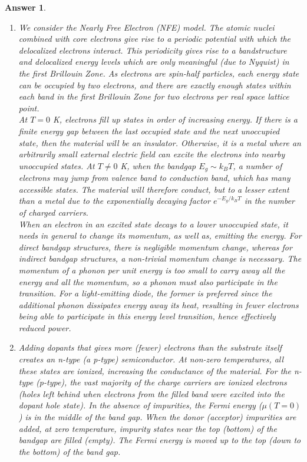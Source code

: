 \documentclass[a4paper]{article}
\newtheorem{ans}{Answer}[subsection]
\theoremstyle{new}
\begin{document}
\begin{ans}\leavevmode
\begin{enumerate}[label=(\roman*)]
\item We consider the Nearly Free Electron (NFE) model. The atomic nuclei combined with core electrons give rise to a periodic potential with which the delocalized electrons interact. This periodicity gives rise to a bandstructure and delocalized energy levels which are only meaningful (due to Nyquist) in the first Brillouin Zone. As electrons are spin-half particles, each energy state can be occupied by two electrons, and there are exactly enough states within each band in the first Brillouin Zone for two electrons per real space lattice point.\\[5pt]
At $T=0$ K, electrons fill up states in order of increasing energy. If there is a finite energy gap between the last occupied state and the next unoccupied state, then the material will be an insulator. Otherwise, it is a metal where an arbitrarily small external electric field can excite the electrons into nearby unoccupied states. At $T\neq 0$ K, when the bandgap $E_g\sim k_BT$, a number of electrons may jump from valence band to conduction band, which has many accessible states. The material will therefore conduct, but to a lesser extent than a metal due to the exponentially decaying factor $e^{-E_g/k_BT}$ in the number of charged carriers.\\[5pt]
When an electron in an excited state decays to a lower unoccupied state, it needs in general to change its momentum, as well as, emitting the energy. For direct bandgap structures, there is negligible momentum change, whereas for indirect bandgap structures, a non-trivial momentum change is necessary. The momentum of a phonon per unit energy is too small to carry away all the energy and all the momentum, so a phonon must also participate in the transition. For a light-emitting diode, the former is preferred since the additional phonon dissipates energy away its heat, resulting in fewer electrons being able to participate in this energy level transition, hence effectively reduced power.
\item Adding dopants that gives more (fewer) electrons than the substrate itself creates an n-type (a p-type) semiconductor. At non-zero temperatures, all these states are ionized, increasing the conductance of the material. For the n-type (p-type), the vast majority of the charge carriers are ionized electrons (holes left behind when electrons from the filled band were excited into the dopant hole state). In the absence of impurities, the Fermi energy ($\mu(T=0)$) is in the middle of the band gap. When the donor (acceptor) impurities are added, at zero temperature, impurity states near the top (bottom) of the bandgap are filled (empty). The Fermi energy is moved up to the top (down to the bottom) of the band gap.\\[5pt]

\end{enumerate}
\end{ans}
\end{document}
